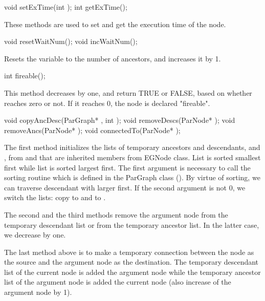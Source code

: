 \begin{example}
void setExTime(int );
int getExTime();
\end{example}

These methods are used to set and get the execution time of the node.

\begin{example}
void resetWaitNum();
void incWaitNum();
\end{example}

Resets the  variable to the number of ancestors, and
increases it by 1.

\begin{example}
int fireable();
\end{example}

This method decreases  by one, and return TRUE or FALSE,
based on whether  reaches zero or not. If it reaches 0,
the node is declared "fireable".

\begin{example}
void copyAncDesc(ParGraph* , int );
void removeDescs(ParNode* );
void removeAncs(ParNode* );
void connectedTo(ParNode* );
\end{example}

The first method initializes the lists of temporary ancestors and
descendants,  and , from 
 and  that are inherited members from
EGNode class. List  is sorted smallest 
first while list  is sorted largest 
first. The first argument is necessary to call the sorting routine which
is defined in the ParGraph class (). By virtue of
sorting, we can traverse descendant with larger  first.
If the second argument is not 0, we switch the lists: copy 
 to  and  to
.

The second and the third methods remove the argument node from the
temporary descendant list or from the temporary ancestor list. In the latter
case, we decrease  by one.

The last method above is to make a temporary connection between the 
node as the source and the argument node as the destination. The temporary
descendant list of the current node is added the argument node while the
temporary ancestor list of the argument node is added the current node (also
increase  of the argument node by 1).

